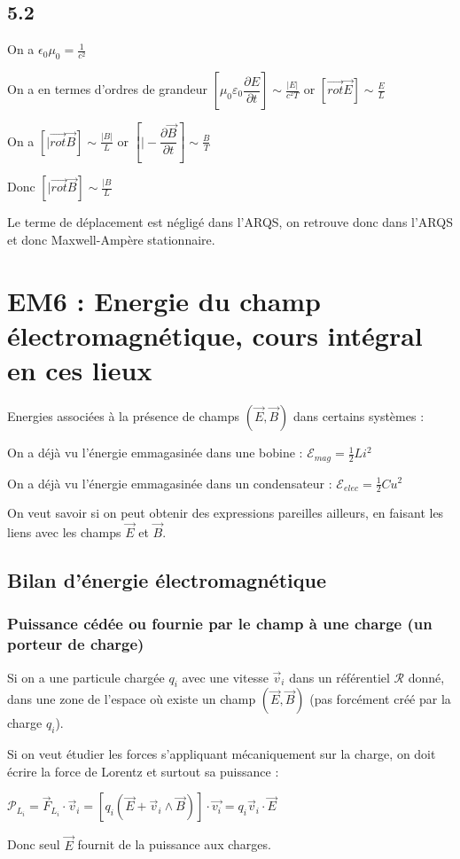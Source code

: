 \documentclass[a4paper,12pt]{book}
\begin{document}
\subsection{5.2}
On a $\epsilon_0\mu_0=\frac{1}{c^2}$
\par On a en termes d'ordres de grandeur $\left[\mu_0\varepsilon_0\dfrac{\partial E}{\partial t}\right] \sim\frac{\vert E\vert}{c^2T}$ or $\left[\vec{rot}\vec{E}\right] \sim\frac{E}{L}$
\par On a $\left[\vert\vec{rot}\vec{B}\right]\sim\frac{\vert B\vert}{L}$ or $\left[\vert-\dfrac{\partial\vec{B}}{\partial t}\right]\sim \frac{B}{T}$
\par Donc $\left[\vert \vec{rot}\vec{B}\right]\sim\frac{\vert B}{L}$
\par Le terme de déplacement est négligé dans l'ARQS, on retrouve donc dans l'ARQS et donc Maxwell-Ampère stationnaire.


\section{EM6 : Energie du champ électromagnétique, cours intégral en ces lieux}
Energies associées à la présence de champs $(\vec{E},\vec{B})$ dans certains systèmes :
\par On a déjà vu l'énergie emmagasinée dans une bobine : $\mathcal{E}_{mag}=\frac{1}{2}Li^2$
\par On a déjà vu l'énergie emmagasinée dans un condensateur : $\mathcal{E}_{elec}=\frac{1}{2}Cu^2$
\par On veut savoir si on peut obtenir des expressions pareilles ailleurs, en faisant les liens avec les champs $\vec{E}$ et $\vec{B}$.

\subsection{Bilan d'énergie électromagnétique}
\subsubsection{Puissance cédée ou fournie par le champ à une charge (un porteur de charge)}
Si on a une particule chargée $q_i$ avec une vitesse $\vec{v}_i$ dans un référentiel $\mathcal{R}$ donné, dans une zone de l'espace où existe un champ $(\vec{E},\vec{B})$ (pas forcément créé par la charge $q_i$).
\par Si on veut étudier les forces s'appliquant mécaniquement sur la charge, on doit écrire la force de Lorentz et surtout sa puissance :
\par $\mathcal{P}_{L_i}=\vec{F}_{L_i}\cdot \vec{v}_i = \left[q_i(\vec{E}+\vec{v}_i\wedge\vec{B})\right]\cdot\vec{v_i} = q_i\vec{v}_i\cdot\vec{E}$ \par Donc seul $\vec{E}$ fournit de la puissance aux charges.
\end{document}
